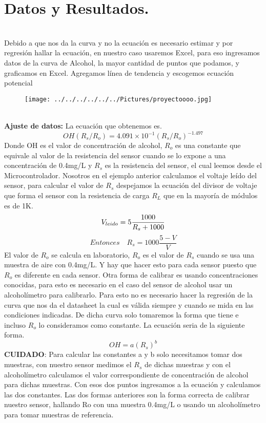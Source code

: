 \documentclass[11pt,a4paper]{article}
\begin{document}
\section{Datos y Resultados.}\\
Debido a que nos da la curva y no la ecuaci\'{o}n es necesario estimar y por regresi\'{o}n hallar la ecuaci\'{o}n, en nuestro caso usaremos Excel, para eso ingresamos datos de la curva de Alcohol, la mayor cantidad de puntos que podamos, y graficamos en Excel. Agregamos l\'{i}nea de tendencia y escogemos ecuaci\'{o}n potencial
\begin{figure}[hbtp]
\centering
\texttt{[image: ../../../../../../Pictures/proyectoooo.jpg]}
\end{figure}
\\
\textbf{Ajuste de datos:} La ecuaci\'{o}n que obtenemos es.
\[OH({R}_{s}/{R}_{o})=4.091\times {10}^{-1}{({R}_{s}/{R}_{o})}^{-1.497} \]
Donde OH es el valor de concentraci\'{o}n de alcohol, ${R}_{o}$ es una constante que equivale al valor de la resistencia del sensor cuando se lo expone a una concentraci\'{o}n de 0.4mg/L y ${R}_{s}$ es la resistencia del sensor, el cual leemos desde el Microcontrolador. Nosotros en el ejemplo anterior calculamos el voltaje le\'{i}do del sensor, para calcular el valor de ${R}_{s}$ despejamos la ecuaci\'{o}n del divisor de voltaje que forma el sensor con la resistencia de carga ${R}_{L}$ que en la mayor\'{i}a de m\'{o}dulos es de 1K.
\[{V}_{le\\{i}do} = 5 \frac{1000}{{R}_{s} + 1000} \]
\[Entonces \quad {R}_{s} = 1000 \frac{5-V}{V}\]
El valor de ${R}_{o}$ se calcula en laboratorio, ${R}_{o}$ es el valor de ${R}_{s}$ cuando se usa una muestra de aire con 0.4mg/L. Y hay que hacer esto para cada sensor puesto que ${R}_{o}$ es diferente en cada sensor. Otra forma de calibrar es usando concentraciones conocidas, para esto es necesario en el caso del sensor de alcohol usar un alcohol\'{i}metro para calibrarlo. Para esto no es necesario hacer la regresi\'{o}n de  la curva que nos da el datasheet la cual es v\'{a}lida siempre y cuando se mida en las condiciones indicadas. De dicha curva solo tomaremos la forma que tiene e incluso ${R}_{o}$  lo consideramos como constante. La ecuaci\'{o}n seria de la siguiente forma.
\[OH = a({R}_{s})^{b}\]
\textbf{CUIDADO}: Para calcular las constantes a y b solo necesitamos tomar dos muestras, con nuestro sensor medimos el ${R}_{s}$ de dichas muestras y con el alcohol\'{i}metro calculamos el valor correspondiente de concentraci\'{o}n de alcohol para dichas muestras. Con esos dos puntos ingresamos a la ecuaci\'{o}n y calculamos las dos constantes. Las dos formas anteriores son la forma correcta de calibrar nuestro sensor, hallando Ro con una muestra 0.4mg/L o usando un alcohol\'{i}metro para tomar muestras de referencia.
\end{document}
